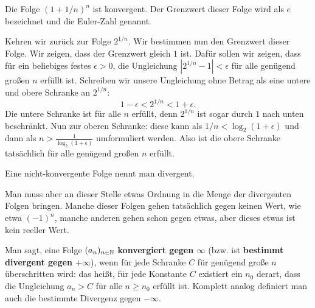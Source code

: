 \begin{thm}
	Die Folge $(1+ 1/n)^n$ ist konvergent. Der Grenzwert dieser Folge wird als $e$ bezeichnet und die Euler-Zahl genannt. 
\end{thm} 

\begin{bsp} 
	Kehren wir zurück zur Folge $2^{1/n}$. Wir bestimmen nun den Grenzwert dieser Folge. Wir zeigen, dass der Grenzwert gleich $1$ ist. Dafür sollen wir zeigen, dass für ein beliebiges festes $\epsilon>0$, die Ungleichung $|2^{1/n} - 1| < \epsilon$ für alle genügend großen $n$ erfüllt ist. Schreiben wir unsere Ungleichung ohne Betrag als eine untere und obere Schranke an $2^{1/n}$: 
	\[
		1 - \epsilon < 2^{1/n} < 1 + \epsilon. 
	\]
	Die untere Schranke ist für alle $n$ erfüllt, denn $2^{1/n}$ ist sogar durch $1$ nach unten beschränkt. Nun zur oberen Schranke: diese kann als $1/n < \log_2 (1 + \epsilon)$ und dann als $n > \frac{1}{\log_2 (1 +\epsilon) }$ umformuliert werden. Also ist die obere Schranke tatsächlich für alle genügend großen $n$ erfüllt. 
\end{bsp} 

\begin{defn}
	Eine nicht-konvergente Folge nennt man divergent. 
\end{defn} 

\begin{bem}
	Man muss aber an dieser Stelle etwas Ordnung in die Menge der divergenten Folgen bringen. Manche dieser Folgen gehen tatsächlich gegen keinen Wert, wie etwa $(-1)^n$, manche anderen gehen schon gegen etwas, aber dieses etwas ist kein reeller Wert. 
\end{bem} 

\begin{defn} 
	Man sagt, eine Folge $(a_n)_{n \in \mathbb{N}}$ \textbf{konvergiert gegen $\infty$}  (bzw. ist \textbf{bestimmt divergent gegen $+\infty$}), wenn für jede Schranke $C$ für genügend große $n$ überschritten wird: das heißt, für jede Konstante $C$ existiert ein $n_0$ derart, dass die Ungleichung $a_n > C$ für alle $n \ge n_0$ erfüllt ist. Komplett analog definiert man auch die bestimmte Divergenz gegen $-\infty$. 
\end{defn} 

